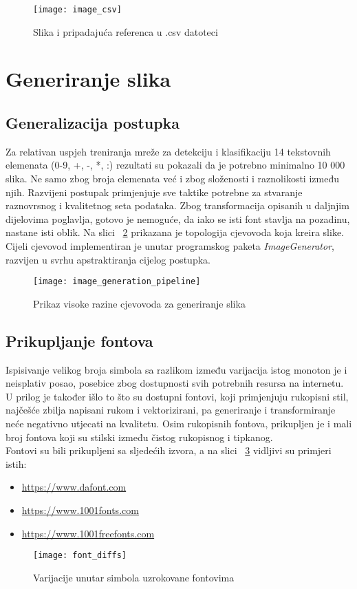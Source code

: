 \begin{figure}[h!]
	\centering
	\texttt{[image: image\_csv]}
	 \caption{Slika i pripadajuća referenca u .csv datoteci}
 	 \label{fig:pipelineExitExample}
\end{figure}

\section{Generiranje slika}
\subsection{Generalizacija postupka}
Za relativan uspjeh treniranja mreže za detekciju i klasifikaciju 14 tekstovnih elemenata (0-9, +, -, *, :) rezultati su pokazali da je potrebno minimalno 10 000 slika. 
Ne samo zbog broja elemenata već i zbog složenosti i raznolikosti između njih. 
Razvijeni postupak primjenjuje sve taktike \cite{chollet2017deep} potrebne za stvaranje raznovrsnog i kvalitetnog seta podataka.
Zbog transformacija opisanih u daljnjim dijelovima poglavlja, gotovo je nemoguće, da iako se isti font stavlja na pozadinu, nastane isti oblik.
Na slici ~\ref{fig:imageGenerationPipeline} prikazana je topologija cjevovoda koja kreira slike.
Cijeli cjevovod implementiran je unutar programskog paketa \emph{ImageGenerator}, razvijen u svrhu apstraktiranja cijelog postupka.
\begin{figure}[h!]
	\centering
	\texttt{[image: image\_generation\_pipeline]}
	 \caption{Prikaz visoke razine cjevovoda za generiranje slika}
 	 \label{fig:imageGenerationPipeline}
\end{figure}

\subsection{Prikupljanje fontova}
Ispisivanje velikog broja simbola sa razlikom između varijacija istog monoton je i neisplativ posao, posebice zbog dostupnosti svih potrebnih resursa na internetu.
U prilog je također išlo to što su dostupni fontovi, koji primjenjuju rukopisni stil, najčešće zbilja napisani rukom i vektorizirani, pa generiranje i transformiranje neće negativno utjecati na kvalitetu.
Osim rukopisnih fontova, prikupljen je i mali broj fontova koji su stilski između čistog rukopisnog i tipkanog. \\
Fontovi su bili prikupljeni sa sljedećih izvora, a na slici ~\ref{fig:fontDiffs} vidljivi su primjeri istih:
\begin{itemize}
\item \url{https://www.dafont.com}
\item \url{https://www.1001fonts.com}
\item \url{https://www.1001freefonts.com}
\end{itemize}
\begin{figure}[h!]
	\centering
	\texttt{[image: font\_diffs]}
	 \caption{Varijacije unutar simbola uzrokovane fontovima}
 	 \label{fig:fontDiffs}
\end{figure}

